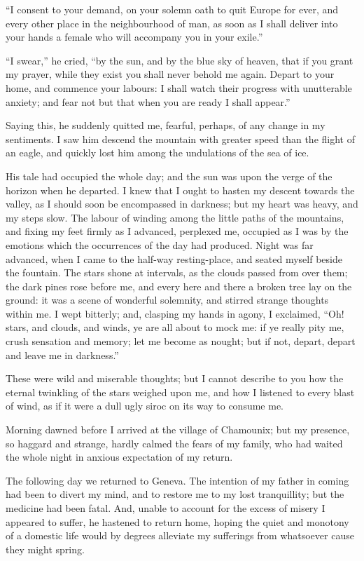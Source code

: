 ``I consent to your demand, on your
solemn oath to quit Europe for ever,
and every other place in the neighbourhood
of man, as soon as I shall deliver
into your hands a female who will accompany
you in your exile.''

``I swear,'' he cried, ``by the sun,
and by the blue sky of heaven, that if
you grant my prayer, while they exist
you shall never behold me again. Depart
to your home, and commence
your labours: I shall watch their progress
with unutterable anxiety; and fear
not but that when you are ready I shall
appear.''

Saying this, he suddenly quitted me,
fearful, perhaps, of any change in my
sentiments. I saw him descend the
mountain with greater speed than the
flight of an eagle, and quickly lost him
among the undulations of the sea of
ice.

His tale had occupied the whole day;
and the sun was upon the verge of the
horizon when he departed. I knew
that I ought to hasten my descent towards
the valley, as I should soon be
encompassed in darkness; but my heart
was heavy, and my steps slow. The
labour of winding among the little
paths of the mountains, and fixing my
feet firmly as I advanced, perplexed
me, occupied as I was by the emotions
which the occurrences of the day had
produced. Night was far advanced,
when I came to the half-way resting-place,
and seated myself beside the
fountain. The stars shone at intervals,
as the clouds passed from over them;
the dark pines rose before me, and
every here and there a broken tree lay
on the ground: it was a scene of wonderful
solemnity, and stirred strange
thoughts within me. I wept bitterly;
and, clasping my hands in agony, I
exclaimed, ``Oh! stars, and clouds,
and winds, ye are all about to mock
me: if ye really pity me, crush sensation
and memory; let me become as
nought; but if not, depart, depart and
leave me in darkness.''

These were wild and miserable
thoughts; but I cannot describe to you
how the eternal twinkling of the stars
weighed upon me, and how I listened
to every blast of wind, as if it were a dull
ugly siroc on its way to consume me.

Morning dawned before I arrived at
the village of Ch\-amou\-nix; but my presence,
so haggard and strange, hardly
calmed the fears of my family, who had
waited the whole night in anxious expectation
of my return.

The following day we returned to
Geneva. The intention of my father
in coming had been to divert my mind,
and to restore me to my lost tranquillity;
but the medicine had been fatal. And,
unable to account for the excess of
misery I appeared to suffer, he hastened
to return home, hoping the quiet and
monotony of a domestic life would by
degrees alleviate my sufferings from
whatsoever cause they might spring.

